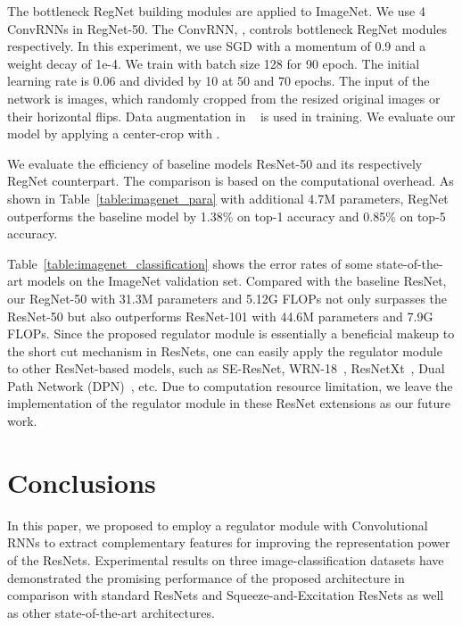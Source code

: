 \documentclass[journal,comsoc]{IEEEtran}
\begin{document}
The bottleneck RegNet building modules are applied to ImageNet. We use 4 ConvRNNs in RegNet-50. The ConvRNN, , controls  bottleneck RegNet modules respectively. In this experiment, we use SGD with a momentum of 0.9 and a weight decay of 1e-4. We train with batch size 128 for 90 epoch. The initial learning rate is 0.06 and divided by 10 at 50 and 70 epochs. The input of the network is  images, which randomly cropped from the resized original images or their horizontal flips. Data augmentation in ~\cite{DBLP:journals/corr/abs-1807-05698} is used in training. We evaluate our model by applying a center-crop with .







We evaluate the efficiency of baseline models ResNet-50 and its respectively RegNet counterpart. The comparison is based on the computational overhead. As shown in Table~\ref{table:imagenet_para} with additional 4.7M parameters, RegNet outperforms the baseline model by 1.38\% on top-1 accuracy and 0.85\% on top-5 accuracy.



Table~\ref{table:imagenet_classification} shows the error rates of some state-of-the-art models on the ImageNet validation set. Compared with the baseline ResNet, our RegNet-50 with 31.3M parameters and 5.12G FLOPs not only surpasses the ResNet-50 but also outperforms ResNet-101 with 44.6M parameters and 7.9G FLOPs.
Since the proposed regulator module is essentially a beneficial makeup to the short cut mechanism in ResNets, one can easily apply the  regulator module to other ResNet-based models, such as SE-ResNet, WRN-18~\cite{DBLP:journals/corr/ZagoruykoK16}, ResNetXt~\cite{DBLP:journals/corr/XieGDTH16}, Dual Path Network (DPN)~\cite{DBLP:journals/corr/ChenLXJYF17}, etc.
Due to computation resource limitation, we leave the implementation of the regulator module in these ResNet extensions as our future work. 

\section{Conclusions}

In this paper, we proposed to employ a regulator module with Convolutional RNNs to extract complementary features for improving the representation power of the ResNets. Experimental results on three image-classification datasets have demonstrated the promising performance of the proposed architecture in comparison with standard ResNets and Squeeze-and-Excitation ResNets as well as other state-of-the-art architectures.
\end{document}
